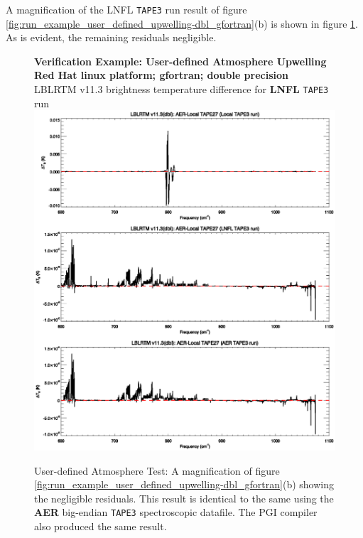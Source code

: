 A magnification of the LNFL \texttt{TAPE3} run result of figure \ref{fig:run_example_user_defined_upwelling-dbl_gfortran}(b) is shown in figure \ref{fig:run_example_user_defined_upwelling-dbl_gfortran_noyshare}. As is evident, the remaining residuals negligible.

\begin{figure}[htp]
  \centering
  \qquad\sffamily\textbf{Verification Example: User-defined Atmosphere Upwelling}\\
  \qquad\sffamily\textbf{Red Hat linux platform; gfortran; double precision}\\
  \qquad\textsf{LBLRTM v11.3 brightness temperature difference for \textbf{LNFL} \texttt{TAPE3} run}\\
  \includegraphics[bb=82 313 534 472,clip,scale=1.0]{graphics/run_example_user_defined_upwelling/gfortran/dbl_noyshare.eps}
  \caption{User-defined Atmosphere Test: A magnification of figure \ref{fig:run_example_user_defined_upwelling-dbl_gfortran}(b) showing the negligible residuals. This result is identical to the same using the \textbf{AER} big-endian \texttt{TAPE3} spectroscopic datafile. The PGI compiler also produced the same result.}
  \label{fig:run_example_user_defined_upwelling-dbl_gfortran_noyshare}
\end{figure}


